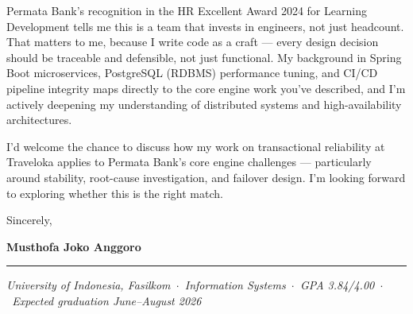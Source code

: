 \documentclass[11pt,a4paper]{article}
\begin{document}
Permata Bank's recognition in the HR Excellent Award 2024 for Learning Development tells
me this is a team that invests in engineers, not just headcount. That matters to me,
because I write code as a craft --- every design decision should be traceable and
defensible, not just functional. My background in Spring Boot microservices, PostgreSQL
(RDBMS) performance tuning, and CI/CD pipeline integrity maps directly to the core engine
work you've described, and I'm actively deepening my understanding of distributed
systems and high-availability architectures.

I'd welcome the chance to discuss how my work on transactional reliability at Traveloka
applies to Permata Bank's core engine challenges --- particularly around stability,
root-cause investigation, and failover design. I'm looking forward to exploring whether
this is the right match.

\vspace{10pt}
Sincerely,

\vspace{18pt}
\textbf{Musthofa Joko Anggoro}

\vspace{10pt}\hrule\vspace{6pt}
\footnotesize
\textit{University of Indonesia, Fasilkom\ $\cdot$\ Information Systems\ $\cdot$\
GPA 3.84/4.00\ $\cdot$\ Expected graduation June--August 2026}
\end{document}
